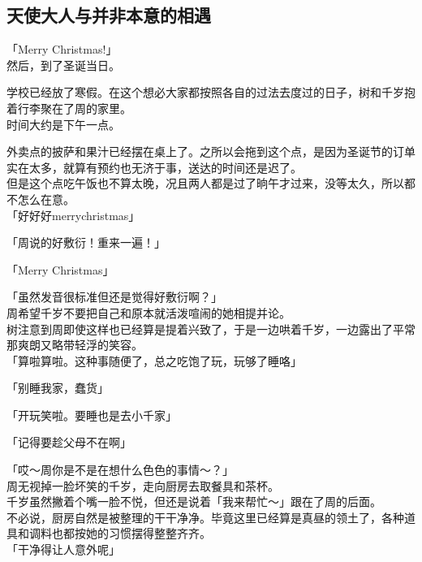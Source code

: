 \subsection{天使大人与并非本意的相遇}

「Merry Christmas!」\\

然后，到了圣诞当日。

学校已经放了寒假。在这个想必大家都按照各自的过法去度过的日子，树和千岁抱着行李聚在了周的家里。\\

时间大约是下午一点。

外卖点的披萨和果汁已经摆在桌上了。之所以会拖到这个点，是因为圣诞节的订单实在太多，就算有预约也无济于事，送达的时间还是迟了。\\

但是这个点吃午饭也不算太晚，况且两人都是过了晌午才过来，没等太久，所以都不怎么在意。\\

「好好好merrychristmas」

「周说的好敷衍！重来一遍！」

「Merry Christmas」

「虽然发音很标准但还是觉得好敷衍啊？」\\

周希望千岁不要把自己和原本就活泼喧闹的她相提并论。\\

树注意到周即使这样也已经算是提着兴致了，于是一边哄着千岁，一边露出了平常那爽朗又略带轻浮的笑容。\\

「算啦算啦。这种事随便了，总之吃饱了玩，玩够了睡咯」

「别睡我家，蠢货」

「开玩笑啦。要睡也是去小千家」

「记得要趁父母不在啊」

「哎～周你是不是在想什么色色的事情～？」\\

周无视掉一脸坏笑的千岁，走向厨房去取餐具和茶杯。\\

千岁虽然撇着个嘴一脸不悦，但还是说着「我来帮忙～」跟在了周的后面。\\

不必说，厨房自然是被整理的干干净净。毕竟这里已经算是真昼的领土了，各种道具和调料也都按她的习惯摆得整整齐齐。\\

「干净得让人意外呢」

